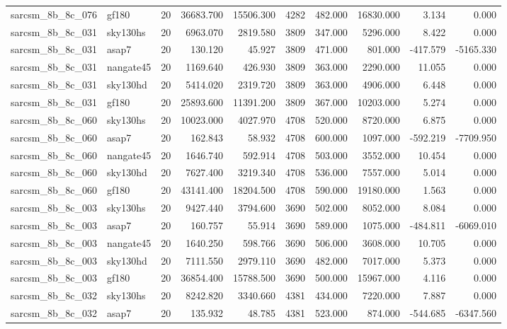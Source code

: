 \begin{longtable}{llrrrrrrrr}
sarcsm\_8b\_8c\_076 & gf180 & 20 & 36683.700 & 15506.300 & 4282 & 482.000 & 16830.000 & 3.134 & 0.000 \\
sarcsm\_8b\_8c\_031 & sky130hs & 20 & 6963.070 & 2819.580 & 3809 & 347.000 & 5296.000 & 8.422 & 0.000 \\
sarcsm\_8b\_8c\_031 & asap7 & 20 & 130.120 & 45.927 & 3809 & 471.000 & 801.000 & -417.579 & -5165.330 \\
sarcsm\_8b\_8c\_031 & nangate45 & 20 & 1169.640 & 426.930 & 3809 & 363.000 & 2290.000 & 11.055 & 0.000 \\
sarcsm\_8b\_8c\_031 & sky130hd & 20 & 5414.020 & 2319.720 & 3809 & 363.000 & 4906.000 & 6.448 & 0.000 \\
sarcsm\_8b\_8c\_031 & gf180 & 20 & 25893.600 & 11391.200 & 3809 & 367.000 & 10203.000 & 5.274 & 0.000 \\
sarcsm\_8b\_8c\_060 & sky130hs & 20 & 10023.000 & 4027.970 & 4708 & 520.000 & 8720.000 & 6.875 & 0.000 \\
sarcsm\_8b\_8c\_060 & asap7 & 20 & 162.843 & 58.932 & 4708 & 600.000 & 1097.000 & -592.219 & -7709.950 \\
sarcsm\_8b\_8c\_060 & nangate45 & 20 & 1646.740 & 592.914 & 4708 & 503.000 & 3552.000 & 10.454 & 0.000 \\
sarcsm\_8b\_8c\_060 & sky130hd & 20 & 7627.400 & 3219.340 & 4708 & 536.000 & 7557.000 & 5.014 & 0.000 \\
sarcsm\_8b\_8c\_060 & gf180 & 20 & 43141.400 & 18204.500 & 4708 & 590.000 & 19180.000 & 1.563 & 0.000 \\
sarcsm\_8b\_8c\_003 & sky130hs & 20 & 9427.440 & 3794.600 & 3690 & 502.000 & 8052.000 & 8.084 & 0.000 \\
sarcsm\_8b\_8c\_003 & asap7 & 20 & 160.757 & 55.914 & 3690 & 589.000 & 1075.000 & -484.811 & -6069.010 \\
sarcsm\_8b\_8c\_003 & nangate45 & 20 & 1640.250 & 598.766 & 3690 & 506.000 & 3608.000 & 10.705 & 0.000 \\
sarcsm\_8b\_8c\_003 & sky130hd & 20 & 7111.550 & 2979.110 & 3690 & 482.000 & 7017.000 & 5.373 & 0.000 \\
sarcsm\_8b\_8c\_003 & gf180 & 20 & 36854.400 & 15788.500 & 3690 & 500.000 & 15967.000 & 4.116 & 0.000 \\
sarcsm\_8b\_8c\_032 & sky130hs & 20 & 8242.820 & 3340.660 & 4381 & 434.000 & 7220.000 & 7.887 & 0.000 \\
sarcsm\_8b\_8c\_032 & asap7 & 20 & 135.932 & 48.785 & 4381 & 523.000 & 874.000 & -544.685 & -6347.560 \\

\end{longtable}
